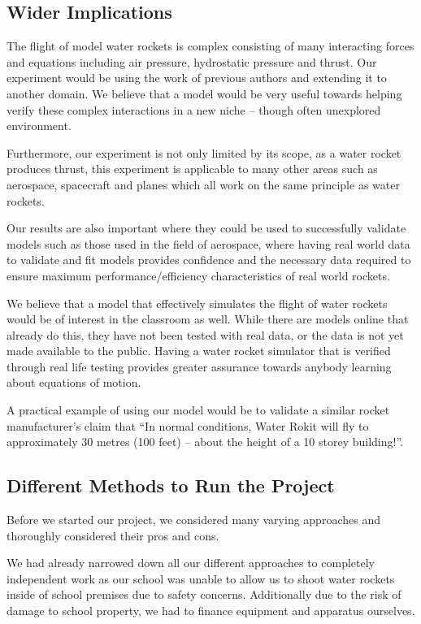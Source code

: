 \documentclass[14pt]{article}
\begin{document}
\subsection{Wider Implications}
The flight of model water rockets is complex consisting of many interacting forces and equations including air pressure, hydrostatic pressure and thrust. Our experiment would be using the work of previous authors and extending it to another domain. We believe that a model would be very useful towards helping verify these complex interactions in a new niche -- though often unexplored environment.

Furthermore, our experiment is not only limited by its scope, as a water rocket produces thrust, this experiment is applicable to many other areas such as aerospace, spacecraft and planes which all work on the same principle as water rockets.

Our results are also important where they could be used to successfully validate models such as those used in the field of aerospace, where having real world data to validate and fit models provides confidence and the necessary data required to ensure maximum performance/efficiency characteristics of real world rockets.

We believe that a model that effectively simulates the flight of water rockets would be of interest in the classroom as well. While there are models online that already do this, they have not been tested with real data, or the data is not yet made available to the public. Having a water rocket simulator that is verified through real life testing provides greater assurance towards anybody learning about equations of motion.

A practical example of using our model would be to validate a similar rocket manufacturer's claim that ``In normal conditions, Water Rokit will fly to approximately 30 metres (100 feet) – about the height of a 10 storey building!''. \cite{1}
\subsection{Different Methods to Run the Project}
Before we started our project, we considered many varying approaches and thoroughly considered their pros and cons.

We had already narrowed down all our different approaches to completely independent work as our school was unable to allow us to shoot water rockets inside of school premises due to safety concerns.
Additionally due to the risk of damage to school property, we had to finance equipment and apparatus ourselves.
\end{document}
